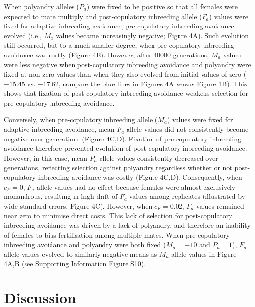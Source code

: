 \documentclass[12pt]{article}
\begin{document}
When polyandry alleles ($P_{a}$) were fixed to be positive so that all females were expected to mate multiply and post-copulatory inbreeding allele ($F_{a}$) values were fixed for adaptive inbreeding avoidance, pre-copulatory inbreeding avoidance evolved (i.e., $M_{a}$ values became increasingly negative; Figure 4A). Such evolution still occurred, but to a much smaller degree, when pre-copulatory inbreeding avoidance was costly (Figure 4B). However, after $40000$ generations, $M_{a}$ values were less negative when post-copulatory inbreeding avoidance and polyandry were fixed at non-zero values than when they also evolved from initial values of zero ($-15.45$ vs. $-17.62$; compare the blue lines in Figures 4A versus Figure 1B). This shows that fixation of post-copulatory inbreeding avoidance weakens selection for pre-copulatory inbreeding avoidance.

Conversely, when pre-copulatory inbreeding allele ($M_{a}$) values were fixed for adaptive inbreeding avoidance, mean $F_{a}$ allele values did not consistently become negative over generations (Figure 4C,D). Fixation of pre-copulatory inbreeding avoidance therefore prevented evolution of post-copulatory inbreeding avoidance. However, in this case, mean $P_{a}$ allele values consistently decreased over generations, reflecting selection against polyandry regardless whether or not post-copulatory inbreeding avoidance was costly (Figure 4C,D). Consequently, when $c_{F}=0$, $F_{a}$ allele values had no effect because females were almost exclusively monandrous, resulting in high drift of $F_{a}$ values among replicates (illustrated by wide standard errors, Figure 4C). However, when $c_{F}=0.02$, $F_{a}$ values remained near zero to minimise direct costs. This lack of selection for post-copulatory inbreeding avoidance was driven by a lack of polyandry, and therefore an inability of females to bias fertilisation among multiple mates. When pre-copulatory inbreeding avoidance and polyandry were both fixed ($M_{a}=-10$ and $P_{a}=1$), $F_{a}$ allele values evolved to similarly negative means as $M_{a}$ allele values in Figure 4A,B (see Supporting Information Figure S10). 

\section*{Discussion}
\end{document}
